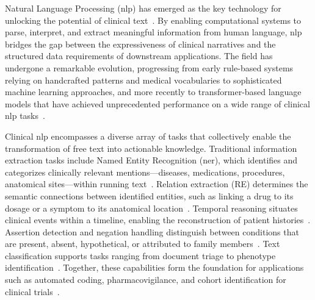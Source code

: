 Natural Language Processing (\gls{nlp}) has emerged as the key technology for unlocking the potential of clinical text~\citep{wang2018clinical, yadav2018mining}. By enabling computational systems to parse, interpret, and extract meaningful information from human language, \gls{nlp} bridges the gap between the expressiveness of clinical narratives and the structured data requirements of downstream applications. The field has undergone a remarkable evolution, progressing from early rule-based systems relying on handcrafted patterns and medical vocabularies to sophisticated machine learning approaches, and more recently to transformer-based language models that have achieved unprecedented performance on a wide range of clinical \gls{nlp} tasks~\citep{kalyan2022ammu, wu2022neural, sahoo2024llm}.

Clinical \gls{nlp} encompasses a diverse array of tasks that collectively enable the transformation of free text into actionable knowledge. Traditional information extraction tasks include Named Entity Recognition (\gls{ner}), which identifies and categorizes clinically relevant mentions—diseases, medications, procedures, anatomical sites—within running text~\citep{wang2019clinical, nasar2021named}. Relation extraction (RE) determines the semantic connections between identified entities, such as linking a drug to its dosage or a symptom to its anatomical location~\citep{frailenavarroClinicalNamedEntity2023}. Temporal reasoning situates clinical events within a timeline, enabling the reconstruction of patient histories~\citep{bethard2017semeval}. Assertion detection and negation handling distinguish between conditions that are present, absent, hypothetical, or attributed to family members~\citep{chapman2013extending}. Text classification supports tasks ranging from document triage to phenotype identification~\citep{yim2016natural}. Together, these capabilities form the foundation for applications such as automated coding, pharmacovigilance, and cohort identification for clinical trials~\citep{kreimeyer2017natural, wang2018clinical}.

